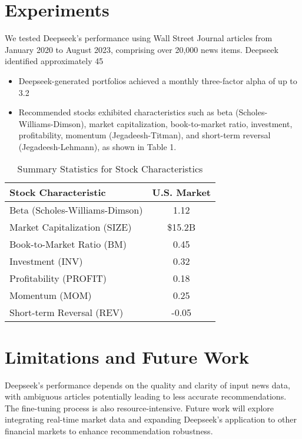 \documentclass{article}
\begin{document}
\section{Experiments}
We tested Deepseek’s performance using Wall Street Journal articles from January 2020 to August 2023, comprising over 20,000 news items. Deepseek identified approximately 45%
\begin{itemize}
    \item Deepseek-generated portfolios achieved a monthly three-factor alpha of up to 3.2%
    \item Recommended stocks exhibited characteristics such as beta (Scholes-Williams-Dimson), market capitalization, book-to-market ratio, investment, profitability, momentum (Jegadeesh-Titman), and short-term reversal (Jegadeesh-Lehmann), as shown in Table 1.
\end{itemize}

\begin{table}[h]
\centering
\caption{Summary Statistics for Stock Characteristics}
\begin{tabular}{lc}
\toprule
\textbf{Stock Characteristic} & \textbf{U.S. Market} \\
\midrule
Beta (Scholes-Williams-Dimson) & 1.12 \\
Market Capitalization (SIZE) & \$15.2B \\
Book-to-Market Ratio (BM) & 0.45 \\
Investment (INV) & 0.32 \\
Profitability (PROFIT) & 0.18 \\
Momentum (MOM) & 0.25 \\
Short-term Reversal (REV) & -0.05 \\
\bottomrule
\end{tabular}
\end{table}

\section{Limitations and Future Work}
Deepseek’s performance depends on the quality and clarity of input news data, with ambiguous articles potentially leading to less accurate recommendations. The fine-tuning process is also resource-intensive. Future work will explore integrating real-time market data and expanding Deepseek’s application to other financial markets to enhance recommendation robustness.
\end{document}
